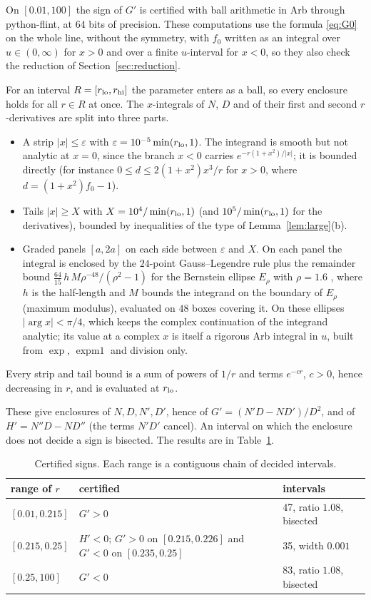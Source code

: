 \documentclass[11pt]{amsart}
\theoremstyle{remark}
\numberwithin{equation}{section}
\begin{document}
On $[0.01,100]$ the sign of $G'$ is certified with ball arithmetic in Arb \cite{Arb} through python-flint, at 64 bits of precision. These computations use the formula \eqref{eq:G0} on the whole line, without the symmetry, with $f_0$ written as an integral over $u\in(0,\infty)$ for $x>0$ and over a finite $u$-interval for $x<0$, so they also check the reduction of Section~\ref{sec:reduction}.

For an interval $R=[r_{\rm lo},r_{\rm hi}]$ the parameter enters as a ball, so every enclosure holds for all $r\in R$ at once. The $x$-integrals of $N$, $D$ and of their first and second $r$-derivatives are split into three parts.
\begin{itemize}
\item A strip $|x|\le\varepsilon$ with $\varepsilon=10^{-5}\min(r_{\rm lo},1)$. The integrand is smooth but not analytic at $x=0$, since the branch $x<0$ carries $e^{-r(1+x^2)/|x|}$; it is bounded directly (for instance $0\le d\le 2(1+x^2)x^3/r$ for $x>0$, where $d=(1+x^2)f_0-1$).
\item Tails $|x|\ge X$ with $X=10^4/\min(r_{\rm lo},1)$ (and $10^5/\min(r_{\rm lo},1)$ for the derivatives), bounded by inequalities of the type of Lemma~\ref{lem:large}(b).
\item Graded panels $[a,2a]$ on each side between $\varepsilon$ and $X$. On each panel the integral is enclosed by the $24$-point Gauss--Legendre rule plus the remainder bound $\frac{64}{15}\,h\,M\rho^{-48}/(\rho^2-1)$ for the Bernstein ellipse $E_\rho$ with $\rho=1.6$ \cite[Theorem 19.3]{Tr}, where $h$ is the half-length and $M$ bounds the integrand on the boundary of $E_\rho$ (maximum modulus), evaluated on $48$ boxes covering it. On these ellipses $|\arg x|<\pi/4$, which keeps the complex continuation of the integrand analytic; its value at a complex $x$ is itself a rigorous Arb integral in $u$, built from $\exp$, $\operatorname{expm1}$ and division only.
\end{itemize}
Every strip and tail bound is a sum of powers of $1/r$ and terms $e^{-cr}$, $c>0$, hence decreasing in $r$, and is evaluated at $r_{\rm lo}$.

These give enclosures of $N,D,N',D'$, hence of $G'=(N'D-ND')/D^2$, and of $H'=N''D-ND''$ (the terms $N'D'$ cancel). An interval on which the enclosure does not decide a sign is bisected. The results are in Table~\ref{tab:cert}.

\begin{table}[h]
\centering
\begin{tabular}{@{}lp{}l@{}}
\toprule
range of $r$ & certified & intervals \\
\midrule
$[0.01,0.215]$ & $G'>0$ & 47, ratio $1.08$, bisected \\
$[0.215,0.25]$ & $H'<0$; $G'>0$ on $[0.215,0.226]$ and $G'<0$ on $[0.235,0.25]$ & 35, width $0.001$ \\
$[0.25,100]$ & $G'<0$ & 83, ratio $1.08$, bisected \\
\bottomrule
\end{tabular}
\caption{Certified signs. Each range is a contiguous chain of decided intervals.}\label{tab:cert}
\end{table}
\end{document}
